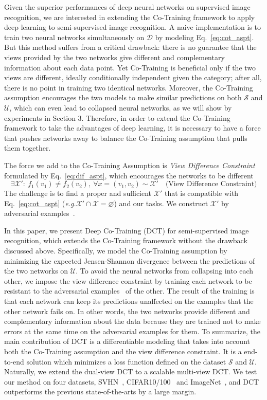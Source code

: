 \documentclass[runningheads]{llncs}
\begin{document}
Given the superior performances of deep neural networks on supervised image recognition, we are interested in extending the Co-Training framework to apply deep learning to semi-supervised image recognition.
A naive implementation is to train two neural networks simultaneously on $\mathcal{D}$ by modeling Eq.~\ref{eq:cot_aspt}.
But this method suffers from a critical drawback: there is no guarantee that the views provided by the two networks give different and complementary information about each data point.
Yet Co-Training is beneficial only if the two views are different, ideally conditionally independent given the category;
after all, there is no point in training two identical networks.
Moreover, the Co-Training assumption encourages the two models to make similar predictions on both $\mathcal{S}$ and $\mathcal{U}$, which can even lead to collapsed neural networks, as we will show by experiments in Section 3.
Therefore, in order to extend the Co-Training framework to take the advantages of deep learning, it is necessary to have a force that pushes networks away to balance the Co-Training assumption that pulls them together.

The force we add to the Co-Training Assumption is \emph{View Difference Constraint} formulated by Eq.~\ref{eq:dif_aspt}, which encourages the networks to be different
\begin{equation}\label{eq:dif_aspt}
  \exists \mathcal{X'}:~f_1(v_1)\neq f_2(v_2),~\forall x = (v_1, v_2)\sim\mathcal{X'} \text{~~~(View Difference Constraint)}
\end{equation}
The challenge is to find a proper and sufficient $\mathcal{X'}$ that is compatible with Eq.~\ref{eq:cot_aspt} (\textit{e.g.}$\mathcal{X'}\cap \mathcal{X}=\varnothing$) and our tasks.
We construct $\mathcal{X}'$ by adversarial examples~\cite{adv}.

In this paper, we present Deep Co-Training (DCT) for semi-supervised image recognition, which extends the Co-Training framework without the drawback discussed above.
Specifically, we model the Co-Training assumption by minimizing the expected Jensen-Shannon divergence between the predictions of the two networks on $\mathcal{U}$.
To avoid the neural networks from collapsing into each other, we impose the view difference constraint by training each network to be resistant to the adversarial examples~\cite{adv,adv2} of the other.
The result of the training is that each network can keep its predictions unaffected on the examples that the other network fails on.
In other words, the two networks provide different and complementary information about the data because they are trained not to make errors at the same time on the adversarial examples for them.
To summarize, the main contribution of DCT is a differentiable modeling that takes into account both the Co-Training assumption and the view difference constraint.
It is a end-to-end solution which minimizes a loss function defined on the dataset $\mathcal{S}$ and $\mathcal{U}$.
Naturally, we extend the dual-view DCT to a scalable multi-view DCT.
We test our method on four datasets, SVHN~\cite{svhn}, CIFAR10/100~\cite{cifar} and ImageNet~\cite{ILSVRC15},
and DCT outperforms the previous state-of-the-arts by a large margin.
\end{document}
